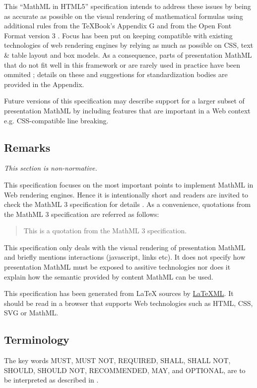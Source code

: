 This ``MathML in HTML5'' specification intends to address these issues by being
as accurate as
possible on the visual rendering of mathematical formulas using additional
rules from the \TeX Book's Appendix G \cite{TeXBook} and from
the Open Font Format version 3 \cite{OpenFontFormat3}.
Focus has been put on keeping compatible with existing technologies of web
rendering engines \cite{HTML5} by relying as much as possible on CSS, text \&
table layout and box models. As a consequence, parts of presentation MathML
that do not fit well in this framework or are rarely used in practice
have been ommited ; details on these and suggestions for standardization bodies
are provided in the Appendix.

Future versions of this specification may describe support for a larger subset
of presentation MathML by including features that are important in a Web context
e.g. CSS-compatible line breaking.

\subsection{Remarks}

{\em This section is non-normative.}

This specification focuses on the most important points to implement
MathML in Web rendering engines. Hence it is intentionally short and readers are
invited to check the MathML 3 specification for details \cite{MathML3}.
As a convenience, quotations from the MathML 3 specification are referred as
follows:
\begin{quote}
This is a quotation from the MathML 3 specification.
\end{quote}

This specification only deals with the visual rendering of presentation MathML
and briefly mentions interactions (javascript, links etc). It does not specify
how presentation MathML must be exposed to assitive technologies nor does it
explain how the semantic provided by content MathML can be used.

This specification has been generated from LaTeX sources by
\href{http://dlmf.nist.gov/LaTeXML/}{LaTeXML}. It
should be read in a browser that supports Web technologies
such as HTML, CSS, SVG or MathML.

\subsection{Terminology}

The key words MUST, MUST NOT, REQUIRED, SHALL, SHALL NOT, SHOULD, SHOULD NOT,
RECOMMENDED, MAY, and OPTIONAL, are to be interpreted as described in
\cite{IETF RFC 2119}.
